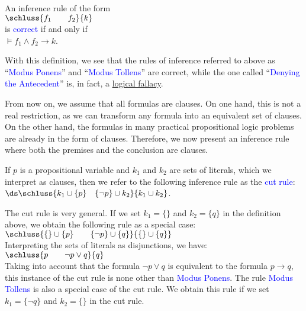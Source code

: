 \begin{Definition}
  An inference rule of the form \\[0.2cm]
  \hspace*{1.3cm} $\schluss{f_1 \qquad f_2}{k}$ \\[0.2cm]
  is \textcolor{blue}{correct} if and only if 
  \\[0.2cm]
  \hspace*{1.3cm}
  $\models f_1 \wedge f_2 \rightarrow k$. \eox
  \\[0.2cm]


\end{Definition}
With this definition, we see that
the rules of inference referred to above as ``\textcolor{blue}{Modus Ponens}'' and ``\textcolor{blue}{Modus Tollens}''
are correct, while the one called ``\textcolor{blue}{Denying the Antecedent}''
is, in fact, a \href{https://en.wikipedia.org/wiki/List_of_fallacies}{logical fallacy}.

From now on, we assume that all formulas are clauses. On one hand, this is
not a real restriction, as we can transform any formula into an equivalent set of
clauses. On the other hand, the formulas in many practical propositional
logic problems are already in the form of clauses. Therefore, we now present an inference rule where
both the premises and the conclusion are clauses.
     
\begin{Definition}
    If $p$ is a propositional variable and $k_1$ and $k_2$ are sets of literals,
    which we interpret as clauses, then we refer to the following inference rule
    as the \textcolor{blue}{cut rule}: 
    \\[0.2cm]
    \hspace*{1.3cm}
    $\ds \schluss{ k_1 \cup \{p\} \quad \{\neg p\} \cup k_2 }{k_1 \cup k_2}$. 
    \eox
\end{Definition}

The cut rule is very general. If we set $k_1 = \{\}$ and $k_2 = \{q\}$ in the definition above,
we obtain the following rule as a special case: \\[0.2cm]
\hspace*{1.3cm} $\schluss{\{\} \cup \{p\} \quad\quad \{\neg p\} \cup \{ q \} }{ \{\} \cup \{q\} }$ \\[0.2cm]
Interpreting the sets of literals as disjunctions, we have: \\[0.2cm]
\hspace*{1.3cm}  $\schluss{p \quad\quad \neg p \vee q }{ q }$ \\[0.2cm]
Taking into account that the formula $\neg p \vee q$ is equivalent to the
formula $p \rightarrow q$, this instance of the cut rule is none other than \textcolor{blue}{Modus Ponens}.
The rule \textcolor{blue}{Modus Tollens} is also a special case of the cut rule. We
obtain this rule if we set $k_1 = \{ \neg q \}$ and $k_2 = \{\}$ in the cut rule.

